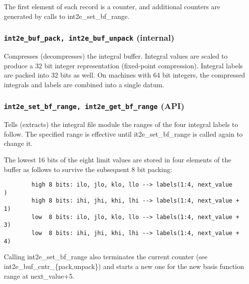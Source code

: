 The first element of each record is a counter, and additional counters
are generated by calls to int2e\_set\_bf\_range.

\subsubsection{{\tt int2e\_buf\_pack, int2e\_buf\_unpack} (internal)}

Compresses (decompresses) the integral buffer.  Integral values are
scaled to produce a 32 bit integer representation (fixed-point
compression).  Integral labels are packed into 32 bits as well.  On
machines with 64 bit integers, the compressed integrals and labels are
combined into a single datum.

\subsubsection{{\tt int2e\_set\_bf\_range, int2e\_get\_bf\_range} (API)}

Tells (extracts) the integral file module the ranges of the four
integral labels to follow. The specified range is effective until
it2e\_set\_bf\_range is called again to change it.

The lowest 16 bits of the eight limit values are stored in four
elements of the buffer as follows to survive the subsequent 8 bit
packing:
\begin{verbatim}
        high 8 bits: ilo, jlo, klo, llo --> labels(1:4, next_value    ) 
        high 8 bits: ihi, jhi, khi, lhi --> labels(1:4, next_value + 1) 
        low  8 bits: ilo, jlo, klo, llo --> labels(1:4, next_value + 3) 
        low  8 bits: ihi, jhi, khi, lhi --> labels(1:4, next_value + 4) 
\end{verbatim}
Calling int2e\_set\_bf\_range also terminates the current counter (see
int2e\_buf\_cntr\_\{pack,unpack\}) and starts a new one for the new basis
function range at next\_value+5.




